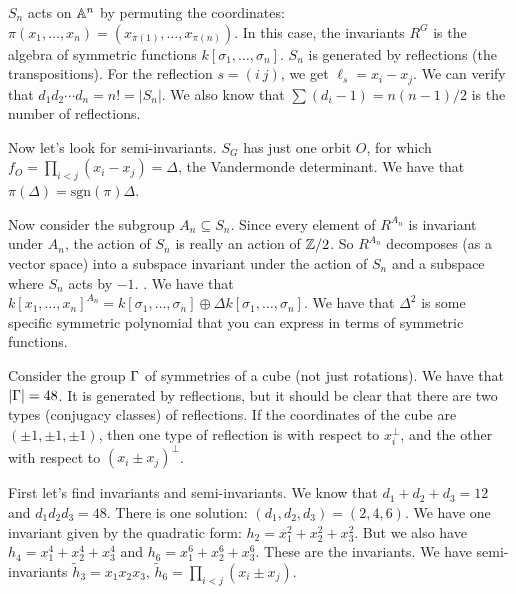 
\begin{example}
 $S_n$ acts on $\AA^n$ by permuting the coordinates: $\pi(x_1,\dots, x_n)=(x_{\pi(1)},\dots, x_{\pi(n)})$. In this case, the invariants $R^G$ is the algebra of symmetric functions $k[\sigma_1,\dots, \sigma_n]$. $S_n$ is generated by reflections (the transpositions). For the reflection $s=(i\ j)$, we get $\ell_s=x_i-x_j$. We can verify that $d_1d_2\cdots d_n=n!=|S_n|$. We also know that $\sum (d_i-1)=n(n-1)/2$ is the number of reflections.
 
 Now let's look for semi-invariants. $S_G$ has just one orbit $O$, for which $f_O=\prod_{i<j}(x_i-x_j)=\Delta$, the Vandermonde determinant. We have that $\pi(\Delta)=\mathrm{sgn}(\pi)\Delta$.
\end{example}
\begin{example}
 Now consider the subgroup $A_n\subseteq S_n$. Since every element of $R^{A_n}$ is invariant under $A_n$, the action of $S_n$ is really an action of $\ZZ/2$. So $R^{A_n}$ decomposes (as a vector space) into a subspace invariant under the action of $S_n$ and a subspace where $S_n$ acts by $-1$. . We have that $k[x_1,\dots, x_n]^{A_n}=k[\sigma_1,\dots, \sigma_n]\oplus \Delta k[\sigma_1,\dots, \sigma_n]$. We have that $\Delta^2$ is some specific symmetric polynomial that you can express in terms of symmetric functions.
\end{example}
\begin{example}
 Consider the group $\Ga$ of symmetries of a cube (not just rotations). We have that $|\Ga|=48$. It is generated by reflections, but it should be clear that there are two types (conjugacy classes) of reflections. If the coordinates of the cube are $(\pm 1,\pm 1,\pm 1)$, then one type of reflection is with respect to $x_i^\perp$, and the other with respect to $(x_i\pm x_j)^\perp$.
 
 First let's find invariants and semi-invariants. We know that $d_1+d_2+d_3=12$ and $d_1d_2d_3=48$. There is one solution: $(d_1,d_2,d_3)=(2,4,6)$. We have one invariant given by the quadratic form: $h_2=x_1^2+x_2^2+x_3^2$. But we also have $h_4=x_1^4+x_2^4+x_3^4$ and $h_6=x_1^6+x_2^6+x_3^6$. These are the invariants. We have semi-invariants $\tilde h_3=x_1x_2x_3$, $\tilde h_6=\prod_{i<j}(x_i\pm x_j)$.
\end{example}

